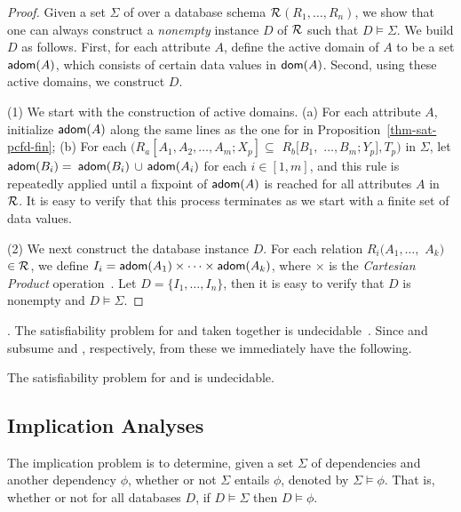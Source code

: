 \begin{proof}
 Given a set $\Sigma$ of \pCINDs over a
database schema $\cal R$$(R_1,\ldots,R_n)$, we show that one can always construct a
{\em nonempty} instance $D$ of $\cal R$ such that $D \models
\Sigma$.  We build $D$ as follows. First, for each attribute $A$, define the
active domain of $A$ to be a set ${\mathsf{adom}}(A)$, which consists of
certain data values in $\protect\mathsf{dom}(A)$. Second, using these active
domains, we construct $D$.

\sstab (1) We start with the construction of active domains. (a) For each
attribute $A$, initialize ${\mathsf{adom}}(A)$ along the same lines as the one
for \pCFDs in Proposition~\ref{thm-sat-pcfd-fin}; (b) For each
\pCIND $(R_a[A_1,A_2,\ldots,A_m;X_p] \subseteq$ $R_b[B_1,$
$\ldots,B_m;Y_p], T_p)$ in $\Sigma$, let ${\mathsf{adom}}(B_i)=$ ${\mathsf{adom}}(B_i)$
$\cup$ ${\mathsf{adom}}(A_i)$ for each $i\in [1,m]$, and this rule is
repeatedly applied until a fixpoint of ${\mathsf{adom}}(A)$ is reached for
all attributes $A$ in $\cal R$.
%
It is easy to verify that this process
terminates as we start with a finite set of data values.

\sstab (2)  We next construct the database instance $D$. For each relation $R_i(A_1, \dots,$ $A_k)$ $\in
{\cal R}$, we define $I_i = {\mathsf{adom}}(A_1)\times \dots \times
{\ensuremath {\mathsf{adom}}}(A_k)$, where $\times$ is the {\em Cartesian Product}
operation~\cite{AbHuVi1995}. Let $D = \{I_1,\dots,I_n\}$, then it is easy to verify
that $D$ is nonempty and $D \models \Sigma$.
\end{proof}


. The satisfiability problem for \CFDs
and \CINDs taken together is undecidable~\cite{CINDs}. Since \pCFDs and
\pCINDs subsume \CFDs and \CINDs, respectively, from these we
immediately have the following.

\vspace{-0.5ex}
\begin{cor}
\label{thm-sat-pcfd-pcind}The satisfiability problem for \pCFDs and
\pCINDs is undecidable.
\end{cor}




\vspace{-3ex}
\subsection{Implication Analyses}

The implication problem is to determine, given a set $\Sigma$ of
dependencies and another dependency $\phi$, whether or not
$\Sigma$ entails $\phi$, denoted by $\Sigma\models\phi$. That is,
whether or not for all databases $D$, if $D\models\Sigma$ then
$D\models\phi$.

